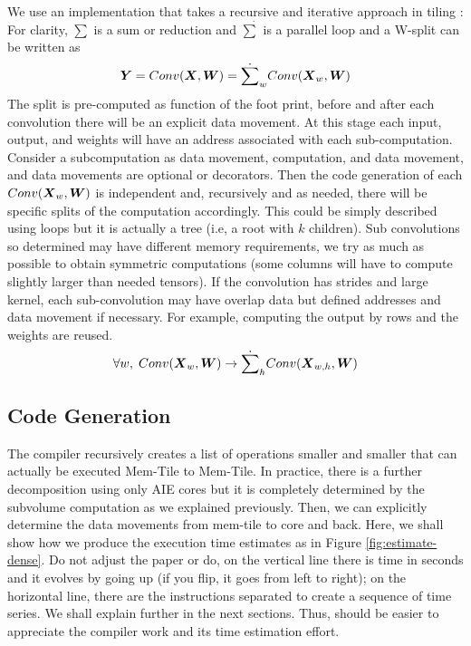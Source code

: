 \documentclass[conference]{IEEEtran}
\begin{document}
We use an implementation that takes a recursive and iterative approach
in tiling \cite{abs-2110-04327}: For clarity, $\sum$ is a sum or
reduction and $\dot{\sum}$ is a parallel loop and a W-split can be
written as
\begin{equation}
  {\boldsymbol Y} =  Conv({\boldsymbol X},{\boldsymbol W}) = \dot{\sum}_w
  Conv({\boldsymbol X}_w,{\boldsymbol W})
\end{equation}
The split is pre-computed as function of the foot print, before and
after each convolution there will be an explicit data movement. At
this stage each input, output, and weights will have an address
associated with each sub-computation. Consider a subcomputation as
data movement, computation, and data movement, and data movements are
optional or decorators.  Then the code generation of each
$Conv({\boldsymbol X}_w,{\boldsymbol W})$ is independent and, recursively and as needed,
there will be specific splits of the computation accordingly. This
could be simply described using loops but it is actually a tree (i.e,
a root with $k$ children). Sub convolutions so determined may have
different memory requirements, we try as much as possible to obtain
symmetric computations (some columns will have to compute slightly
larger than needed tensors). If the convolution has strides and large
kernel, each sub-convolution may have overlap data but defined
addresses and data movement if necessary. For example, computing the
output by rows and the weights are reused.
\begin{equation}
  \forall w, \;   Conv({\boldsymbol X}_w,{\boldsymbol W}) \rightarrow  \dot{\sum}_h Conv({\boldsymbol X}_{w,h},{\boldsymbol W})
\end{equation}





\subsection{Code Generation }
The compiler recursively creates a list of operations smaller and
smaller that can actually be executed Mem-Tile to Mem-Tile. In
practice, there is a further decomposition using only AIE cores but it
is completely determined by the subvolume computation as we explained
previously. Then, we can explicitly determine the data movements from
mem-tile to core and back. Here, we shall show how we produce the
execution time estimates as in Figure \ref{fig:estimate-dense}.  Do
not adjust the paper or do, on the vertical line there is time in
seconds and it evolves by going up (if you flip, it goes from left to
right); on the horizontal line, there are the instructions separated
to create a sequence of time series. We shall explain further in the
next sections. Thus, should be easier to appreciate the compiler work
and its time estimation effort.
\end{document}
